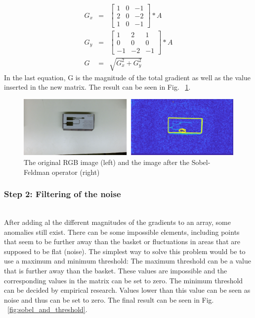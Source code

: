 \documentclass{article}
\begin{document}
\begin{eqnarray*}
G_{x} &=& 
	\begin{bmatrix}
		1&0&-1\\
		2&0&-2\\
		1&0&-1
	\end{bmatrix}
	*A \\
G_{y} &=& 
	\begin{bmatrix}
		1&2&1\\
		0&0&0\\
		-1&-2&-1
	\end{bmatrix}
	*A\\
G &=& \sqrt{G_{x}^2+G_{y}^2}
\end{eqnarray*}
In the last equation, G is the magnitude of the total gradient as well as the value inserted in the new matrix.
The result can be seen in Fig. ~\ref{fig:original_and_sobel}.
\begin{figure}[h]
	\center
  \includegraphics[width=1\linewidth]{original_and_sobel.png}
  \caption{The original RGB image (left) and the image after the Sobel-Feldman operator (right)}
  \label{fig:original_and_sobel}
\end{figure}

\subsubsection{Step 2: Filtering of the noise}\mbox{}\\
After adding al the different magnitudes of the gradients to an array, some anomalies still exist. There can be some impossible elements, including points that seem to be further away than the basket or fluctuations in areas that are supposed to be flat (noise). The simplest way to solve this problem would be to use a maximum and minimum threshold: The maximum threshold can be a value that is further away than the basket. These values are impossible and the corresponding values in the matrix can be set to zero. The minimum threshold can be decided by empirical research. Values lower than this value can be seen as noise and thus can be set to zero. The final result can be seen in Fig. ~\ref{fig:sobel_and_threshold}.
\end{document}
